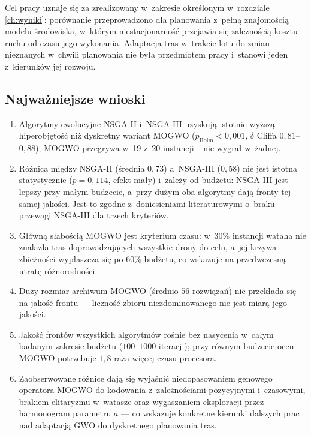 Cel pracy uznaje się za zrealizowany w~zakresie określonym w~rozdziale
\ref{ch:wyniki}: porównanie przeprowadzono dla planowania z~pełną znajomością
modelu środowiska, w~którym niestacjonarność przejawia się zależnością kosztu
ruchu od czasu jego wykonania. Adaptacja tras w~trakcie lotu do zmian
nieznanych w~chwili planowania nie była przedmiotem pracy i~stanowi jeden
z~kierunków jej rozwoju.

\subsection{Najważniejsze wnioski}
\label{sec:podsumowanie_wnioski}

\begin{enumerate}
    \item Algorytmy ewolucyjne NSGA-II i~NSGA-III uzyskują istotnie wyższą
    hiperobjętość niż dyskretny wariant MOGWO ($p_{\text{Holm}} < 0{,}001$,
    $\delta$ Cliffa $0{,}81$--$0{,}88$); MOGWO przegrywa w~19 z~20 instancji
    i~nie wygrał w~żadnej.
    \item Różnica między NSGA-II (średnia $0{,}73$) a~NSGA-III ($0{,}58$) nie jest
    istotna statystycznie ($p = 0{,}114$, efekt mały) i~zależy od budżetu:
    NSGA-III jest lepszy przy małym budżecie, a~przy dużym oba algorytmy dają
    fronty tej samej jakości. Jest to zgodne z~doniesieniami literaturowymi
    o~braku przewagi NSGA-III dla trzech kryteriów.
    \item Główną słabością MOGWO jest kryterium czasu: w~$30\%$ instancji wataha
    nie znalazła tras doprowadzających wszystkie drony do celu, a~jej krzywa
    zbieżności wypłaszcza się po $60\%$ budżetu, co wskazuje na przedwczesną
    utratę różnorodności.
    \item Duży rozmiar archiwum MOGWO (średnio $56$ rozwiązań) nie przekłada
    się na jakość frontu --- liczność zbioru niezdominowanego nie jest miarą jego
    jakości.
    \item Jakość frontów wszystkich algorytmów rośnie bez nasycenia w~całym
    badanym zakresie budżetu ($100$--$1000$ iteracji); przy równym budżecie ocen
    MOGWO potrzebuje $1{,}8$ raza więcej czasu procesora.
    \item Zaobserwowane różnice dają się wyjaśnić niedopasowaniem genowego
    operatora MOGWO do kodowania z~zależnościami pozycyjnymi i~czasowymi,
    brakiem elitaryzmu w~watasze oraz wygaszaniem eksploracji przez harmonogram
    parametru $a$ --- co wskazuje konkretne kierunki dalszych prac nad adaptacją
    GWO do dyskretnego planowania tras.
\end{enumerate}

